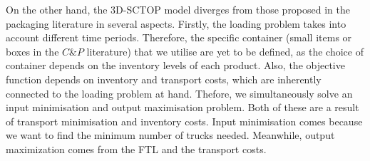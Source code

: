 On the other hand, the 3D-SCTOP model diverges from those proposed in the packaging literature in several aspects. Firstly, the loading problem takes into account different time periods. Therefore, the specific container (small items or boxes in the $C\&P$ literature) that we utilise are yet to be defined, as the choice of container depends on the inventory levels of each product.
Also, the objective function depends on inventory and transport costs, which are inherently connected to the loading problem at hand. Thefore, we simultaneously solve an input minimisation  and output maximisation problem. Both of these are a result of transport minimisation and inventory costs. Input minimisation comes because we want to find the minimum number of trucks needed. Meanwhile, output maximization comes from the FTL and the transport costs.

